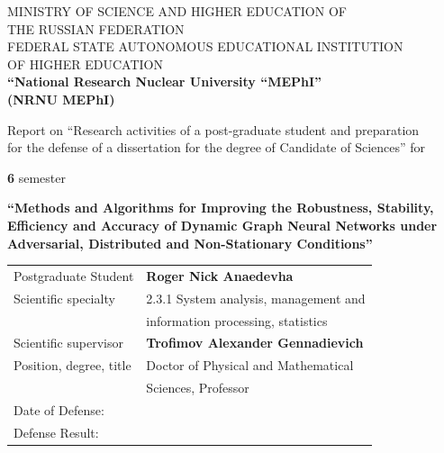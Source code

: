
\begin{titlepage}
\thispagestyle{empty}
\begin{center}

{\small
MINISTRY OF SCIENCE AND HIGHER EDUCATION OF\\
THE RUSSIAN FEDERATION\\
FEDERAL STATE AUTONOMOUS EDUCATIONAL INSTITUTION\\
OF HIGHER EDUCATION\\[2pt]
\textbf{``National Research Nuclear University ``MEPhI''}\\
\textbf{(NRNU MEPhI)}
}

\vspace{1.8cm}

{\small
Report on ``Research activities of a post-graduate student and preparation\\
for the defense of a dissertation for the degree of Candidate of Sciences'' for
}

\vspace{0.5cm}

{\small
\underline{\hspace{1.2cm}}\textbf{6}\underline{\hspace{1.2cm}} semester
}

\vspace{1.5cm}

{\small\textbf{``Methods and Algorithms for Improving the Robustness, Stability, Efficiency and Accuracy of Dynamic Graph Neural Networks under Adversarial, Distributed and Non-Stationary Conditions''}}

\vspace{2.5cm}

\begin{minipage}{0.82\textwidth}
\small\noindent
\begin{tabular}{@{}p{} p{}@{}}
Postgraduate Student & \textbf{Roger Nick Anaedevha}\\
Scientific specialty & 2.3.1 System analysis, management and\\
 & information processing, statistics\\[1.2cm]
Scientific supervisor & \textbf{Trofimov Alexander Gennadievich}\\
Position, degree, title & Doctor of Physical and Mathematical\\
 & Sciences, Professor\\[1.2cm]
Date of Defense: & \\[0.6cm]
Defense Result: & \\
\end{tabular}
\end{minipage}


\end{center}
\end{titlepage}
